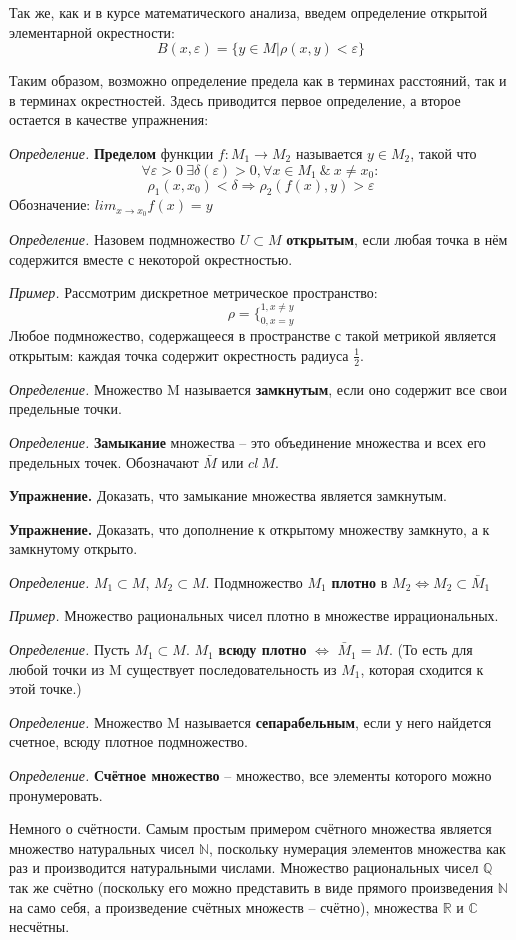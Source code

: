 \documentclass[12pt]{article}
\newcommand{\example}{{\itshape Пример. }}
\newcommand{\equals}{\Leftrightarrow}
\newcommand{\defi}{{\itshape Определение. }}
\newcommand{\exc}{{\bfseries Упражнение. }}
\begin{document}
	Так же, как и в курсе математического анализа, введем определение открытой элементарной окрестности:
	$$B(x, \varepsilon) = \{y \in M | \rho(x,y) < \varepsilon\}$$
	
	Таким образом, возможно определение предела как в терминах расстояний, так и в терминах окрестностей. Здесь приводится первое определение,
	а второе остается в качестве упражнения:
	
	\defi \textbf{Пределом} функции $f : M_1 \rightarrow M_2$ называется $y \in M_2$, такой что $$\forall \varepsilon > 0 ~\exists \delta(\varepsilon) > 0, \forall x \in M_1 ~\&~ x  \neq x_0 : $$
	$$\rho_1(x, x_0) < \delta \Rightarrow \rho_2(f(x), y) > \varepsilon$$
	Обозначение: $lim_{x \rightarrow x_0} f(x) = y$
	
	\defi Назовем подмножество $U \subset M$ \textbf{открытым}, если любая точка в нём содержится вместе с некоторой окрестностью.
	
	\example Рассмотрим дискретное метрическое пространство:
	$$\rho = \{^{1, x \neq y}_{0, x = y}$$
	Любое подмножество, содержащееся в пространстве с такой метрикой является открытым: каждая точка содержит окрестность радиуса 
	$\frac{1}{2}$.
	
	\defi Множество M называется \textbf{замкнутым}, если оно содержит все свои предельные точки.
	
	\defi \textbf{Замыкание} множества -- это объединение множества и всех его предельных точек. Обозначают $\bar{M}$ или $cl ~ M$.
	
	\exc Доказать, что замыкание множества является замкнутым.
	
	\exc Доказать, что дополнение к открытому множеству замкнуто, а к замкнутому открыто.
	
	\defi $M_1 \subset M$, $M_2 \subset M$. Подмножество $M_1$ \textbf{плотно} в $M_2 \equals M_2 \subset \bar{M}_1$
	
	\example Множество рациональных чисел плотно в множестве иррациональных.
	
	\defi Пусть $M_1 \subset M$. $M_1$ \textbf{всюду плотно} $\equals$ $\bar{M}_1 = M$. (То есть для любой точки из M существует последовательность
	из $M_1$, которая сходится к этой точке.)
	
	\defi Множество M называется \textbf{сепарабельным}, если у него найдется счетное, всюду плотное подмножество.
	
	\defi \textbf{Счётное множество} -- множество, все элементы которого можно пронумеровать.

	{\color{gray} Немного о счётности. Самым простым примером счётного множества является множество натуральных чисел $\mathbb{N}$, поскольку нумерация элементов множества как раз и производится натуральными числами. Множество рациональных чисел $\mathbb{Q}$ так же счётно (поскольку его можно представить в виде прямого произведения $\mathbb{N}$ на само себя, а произведение счётных множеств -- счётно), множества $\mathbb{R}$ и $\mathbb{C}$ несчётны.}
	
\end{document}
